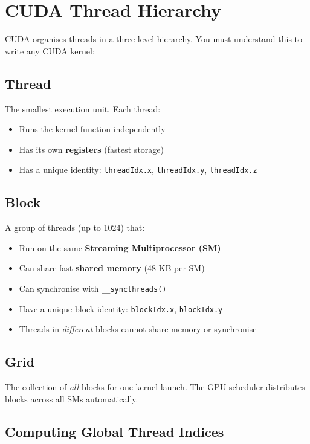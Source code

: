 \documentclass[12pt,a4paper]{article}
\begin{document}
\section{CUDA Thread Hierarchy}

CUDA organises threads in a three-level hierarchy.  You must understand this
to write any CUDA kernel:

\subsection{Thread}
The smallest execution unit.  Each thread:
\begin{itemize}
    \item Runs the kernel function independently
    \item Has its own \textbf{registers} (fastest storage)
    \item Has a unique identity: \texttt{threadIdx.x}, \texttt{threadIdx.y},
          \texttt{threadIdx.z}
\end{itemize}

\subsection{Block}
A group of threads (up to 1024) that:
\begin{itemize}
    \item Run on the same \textbf{Streaming Multiprocessor (SM)}
    \item Can share fast \textbf{shared memory} (48 KB per SM)
    \item Can synchronise with \texttt{\_\_syncthreads()}
    \item Have a unique block identity: \texttt{blockIdx.x}, \texttt{blockIdx.y}
    \item Threads in \emph{different} blocks cannot share memory or synchronise
\end{itemize}

\subsection{Grid}
The collection of \emph{all} blocks for one kernel launch.
The GPU scheduler distributes blocks across all SMs automatically.

\subsection{Computing Global Thread Indices}
\end{document}
